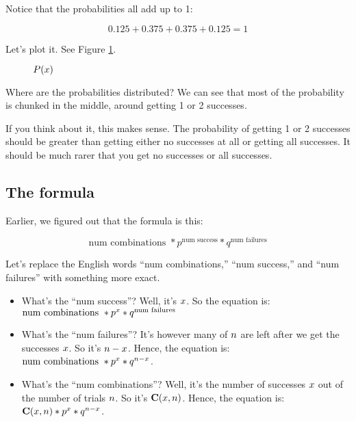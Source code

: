 \documentclass[../../../main.tex]{subfiles}
\begin{document}
\noindent
Notice that the probabilities all add up to 1:

\begin{equation*}
    0.125 + 0.375 + 0.375 + 0.125 = 1
\end{equation*}

\noindent
Let's plot it. See Figure \ref{plot:example-1}.

\begin{figure}[ht]
  \caption{\label{plot:example-1} $\Probability{\RandVarVal/}$}
\end{figure}

Where are the probabilities distributed? We can see that most of the probability is chunked in the middle, around getting 1 or 2 successes. 

If you think about it, this makes sense. The probability of getting 1 or 2 successes should be greater than getting either no successes at all or getting all successes. It should be much rarer that you get no successes or all successes.


\subsection{The formula}

Earlier, we figured out that the formula is this:

\begin{equation*}
    \text{num combinations } * p^{\text{num success}} * q^{\text{num failures}}
\end{equation*}

Let's replace the English words ``num combinations,'' ``num success,'' and ``num failures'' with something more exact.

\begin{itemize}
  \item What's the ``num success''? Well, it's $\RandVarVal/$. So the equation is: $\text{num combinations } * p^{\RandVarVal/} * q^{\text{num failures}}$
  \item What's the ``num failures''? It's however many of $\numTrials/$ are left after we get the successes $\RandVarVal/$. So it's $n - \RandVarVal/$. Hence, the equation is: $\text{num combinations } * p^{\RandVarVal/} * q^{n - \RandVarVal/}$.
  \item What's the ``num combinations''? Well, it's the number of successes $\RandVarVal/$ out of the number of trials $\numTrials/$. So it's $\combs{\RandVarVal/}{n}$. Hence, the equation is: $\combs{\RandVarVal/}{n} * p^{\RandVarVal/} * q^{n - \RandVarVal/}$.
\end{itemize}
\end{document}
